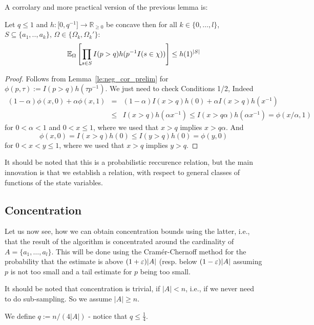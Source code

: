 A corrolary and more practical version of the previous lemma is:
\begin{lemma}\label{le:neg_cor_neg}
Let $q \leq 1$ and $h : \mathbb [0,q^{-1}] \rightarrow \mathbb R_{\geq 0}$ be concave then for all 
$k \in \{0,\ldots,l\}$, $S \subseteq \{a_1,..,a_k\}$, $\Omega \in \{\Omega_k,\Omega_k'\}$:
\[
  \operatorname{\mathbb E}_{\Omega}\left[ \prod_{s \in S} I(p>q) h(p^{-1} I(s \in \chi)) \right] \leq h(1)^{|S|} 
\]
\end{lemma}
\begin{proof}
Follows from Lemma~\ref{le:neg_cor_prelim} for $\phi(p,\tau) := I(p > q) h(\tau p^{-1})$. We just
need to check Conditions 1/2, Indeed
\begin{eqnarray*}
  (1-\alpha) \phi(x,0) + \alpha \phi(x,1) & = & (1-\alpha) I(x>q) h(0) + \alpha I(x>q) h(x^{-1}) \\
   & \leq & I(x > q) h(\alpha x^{-1}) \leq I(x > q \alpha) h(\alpha x^{-1}) = \phi(x/\alpha,1)
\end{eqnarray*}
for $0 < \alpha < 1$ and $0< x \leq 1$, where we used that $x > q$ implies $x > q \alpha$. And
\[
  \phi(x,0) = I(x>q) h(0) \leq I(y > q) h(0) = \phi(y,0)
\]
for $0 < x < y \leq 1$, where we used that $x > q$ implies $y > q$.
\end{proof}

It should be noted that this is a probabilistic reccurence relation, but the main innovation is that
we establish a relation, with respect to general classes of functions of the state variables.

\subsection{Concentration}
Let us now see, how we can obtain concentration bounds using the latter, i.e., that the result of 
the algorithm is concentrated around the cardinality of $A = \{ a_1, \ldots, a_l \}$.
This will be done using the Cram\'{e}r-Chernoff method for the probability that the estimate is 
above $(1+\varepsilon)|A|$ (resp. below $(1-\varepsilon)|A|$ assuming $p$ is not too small and a tail estimate 
for $p$ being too small.

It should be noted that concentration is trivial, if $|A| < n$, i.e., if we never need to do
sub-sampling. So we assume $|A| \geq n$.

We define $q := n/(4|A|)$ - notice that $q \leq \frac{1}{4}$. 

